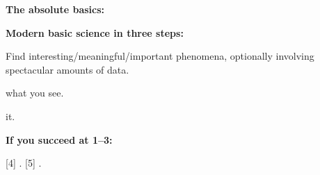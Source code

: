 


  \textbf{The absolute basics:}

  \textbf{Modern basic science in three steps:}
    
    
      Find interesting/meaningful/important phenomena,
      optionally involving spectacular amounts of data.
    
       what you see.
    
       it.
    
  

  \textbf{If you succeed at 1--3:}
    
    [4]
      .
    [5]
      .
    
  

